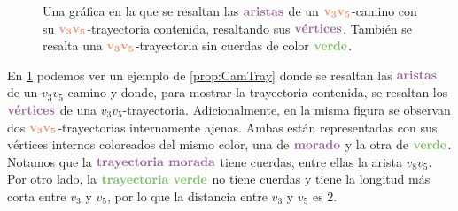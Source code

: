 \begin{figure}[htb!]
    \centering
    \caption{Una gr\'afica en la que se resaltan las ${\color{morado}\bf
    aristas}$ de un ${\color{coral}\bf v_3 v_5}$-camino con su
    ${\color{coral}\bf v_3 v_5}$-trayectoria contenida, resaltando sus
    ${\color{morado}\textbf{v\'ertices}}$.  Tambi\'en se resalta una
    ${\color{coral}\bf v_3 v_5}$-trayectoria sin cuerdas de color
    ${\color{verde}\bf verde}$.}
    \label{fig:ex-caminos}
\end{figure}
    
En \cref{fig:ex-caminos} podemos ver un ejemplo de \cref{prop:CamTray} donde se
resaltan las ${\color{morado}\bf aristas}$ de un $v_3 v_5$-camino y donde, para
mostrar la trayectoria contenida, se resaltan los
${\color{morado}\textbf{v\'ertices}}$ de una $v_3 v_5$-trayectoria.
Adicionalmente, en la misma figura se observan dos ${\color{coral}\bf v_3
v_5}$-trayectorias internamente ajenas. Ambas est\'an representadas con sus
v\'ertices internos coloreados del mismo color, una de ${\color{morado}\bf
morado}$ y la otra de ${\color{verde}\bf verde}$. Notamos que la
${\color{morado}\textbf{trayectoria morada}}$ tiene cuerdas, entre ellas la
arista $v_8v_5$. Por otro lado, la ${\color{verde}\textbf{trayectoria verde}}$
no tiene cuerdas y tiene la longitud m\'as corta entre $v_3$ y $v_5$, por lo que
la distancia entre $v_3$ y $v_5$ es $2$.

